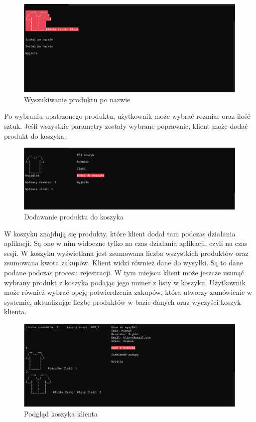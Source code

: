 \begin{figure}[H]
	\centering
		\includegraphics[width=15cm]{screeny/szukaj.png}
	\caption{\footnotesize Wyszukiwanie produktu po nazwie}
	\label{fig:plotend}
\end{figure}

Po wybraniu upatrzonego produktu, użytkownik może wybrać rozmiar oraz ilość sztuk. Jeśli wszystkie parametry zostały wybrane poprawnie, klient może dodać produkt do koszyka.

\begin{figure}[H]
	\centering
		\includegraphics[width=15cm]{screeny/dodawanie_produktu_do_koszyka.png}
	\caption{\footnotesize Dodawanie produktu do koszyka}
	\label{fig:plotend}
\end{figure}

W koszyku znajdują się produkty, które klient dodał tam podczas działania aplikacji. Są one w nim widoczne tylko na czas działania aplikacji, czyli na czas sesji. W koszyku wyświetlana jest zsumowana liczba wszystkich produktów oraz zsumowana kwota zakupów. Klient widzi również dane do wysyłki. Są to dane podane podczas procesu rejestracji. W tym miejscu klient może jeszcze usunąć wybrany produkt z koszyka podając jego numer z listy w koszyku. Użytkownik może również wybrać opcję potwierdzenia zakupów, która utworzy zamówienie w systemie, aktualizując liczbę produktów w bazie danych oraz wyczyści koszyk klienta.

\begin{figure}[H]
	\centering
		\includegraphics[width=15cm]{screeny/koszyk.png}
	\caption{\footnotesize Podgląd koszyka klienta}
	\label{fig:plotend}
\end{figure}

